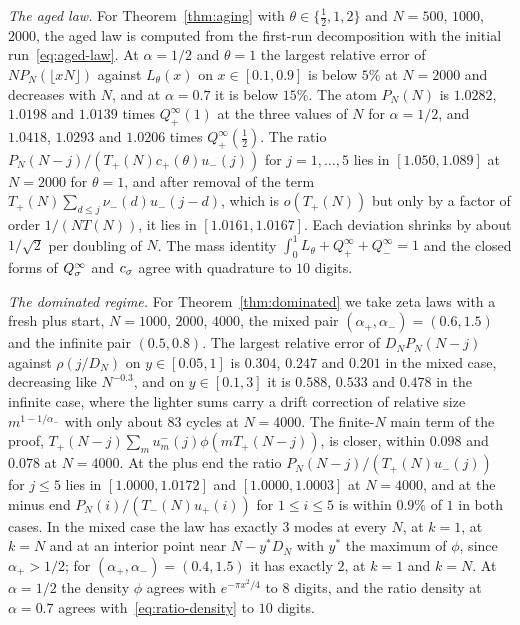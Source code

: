 \emph{The aged law.} For Theorem~\ref{thm:aging} with $\theta\in\{\frac12,1,2\}$ and
$N=500$, $1000$, $2000$, the aged law is computed from the first-run decomposition with the
initial run~\eqref{eq:aged-law}. At $\alpha=1/2$ and $\theta=1$ the largest relative error of
$NP_N(\lfloor xN\rfloor)$ against $L_\theta(x)$ on $x\in[0.1,0.9]$ is below $5\%$ at $N=2000$ and
decreases with $N$, and at $\alpha=0.7$ it is below $15\%$. The atom $P_N(N)$ is $1.0282$,
$1.0198$ and $1.0139$ times $Q^\infty_\plus(1)$ at the three values of $N$ for $\alpha=1/2$, and
$1.0418$, $1.0293$ and $1.0206$ times $Q^\infty_\plus(\frac12)$. The ratio
$P_N(N-j)/(T_\plus(N)c_\plus(\theta)u_\minus(j))$ for $j=1,\dots,5$ lies in $[1.050,1.089]$ at
$N=2000$ for $\theta=1$, and after removal of the term $T_\plus(N)\sum_{d\le j}\nu_\minus(d)u_\minus(j-d)$,
which is $o(T_\plus(N))$ but only by a factor of order $1/(NT(N))$, it lies in $[1.0161,1.0167]$.
Each deviation shrinks by about $1/\sqrt2$ per doubling of $N$. The mass identity
$\int_0^1L_\theta+Q^\infty_\plus+Q^\infty_\minus=1$ and the closed forms of $Q^\infty_\sigma$ and
$c_\sigma$ agree with quadrature to $10$ digits.

\emph{The dominated regime.} For Theorem~\ref{thm:dominated} we take zeta laws with a fresh
plus start, $N=1000$, $2000$, $4000$, the mixed pair $(\alpha_\plus,\alpha_\minus)=(0.6,1.5)$ and
the infinite pair $(0.5,0.8)$. The largest relative error of $D_NP_N(N-j)$ against
$\rho(j/D_N)$ on $y\in[0.05,1]$ is $0.304$, $0.247$ and $0.201$ in the mixed case, decreasing
like $N^{-0.3}$, and on $y\in[0.1,3]$ it is $0.588$, $0.533$ and $0.478$ in the infinite case,
where the lighter sums carry a drift correction of relative size $m^{1-1/\alpha_\minus}$ with
only about $83$ cycles at $N=4000$. The finite-$N$ main term of the proof,
$T_\plus(N-j)\sum_mu^\minus_m(j)\phi(mT_\plus(N-j))$, is closer, within $0.098$ and $0.078$ at
$N=4000$. At the plus end the ratio $P_N(N-j)/(T_\plus(N)u_\minus(j))$ for $j\le5$ lies in
$[1.0000,1.0172]$ and $[1.0000,1.0003]$ at $N=4000$, and at the minus end
$P_N(i)/(T_\minus(N)u_\plus(i))$ for $1\le i\le5$ is within $0.9\%$ of $1$ in both cases. In the
mixed case the law has exactly $3$ modes at every $N$, at $k=1$, at $k=N$ and at an interior
point near $N-y^*D_N$ with $y^*$ the maximum of $\phi$, since $\alpha_\plus>1/2$; for
$(\alpha_\plus,\alpha_\minus)=(0.4,1.5)$ it has exactly $2$, at $k=1$ and $k=N$. At $\alpha=1/2$ the
density $\phi$ agrees with $e^{-\pi x^2/4}$ to $8$ digits, and the ratio density at
$\alpha=0.7$ agrees with~\eqref{eq:ratio-density} to $10$ digits.

